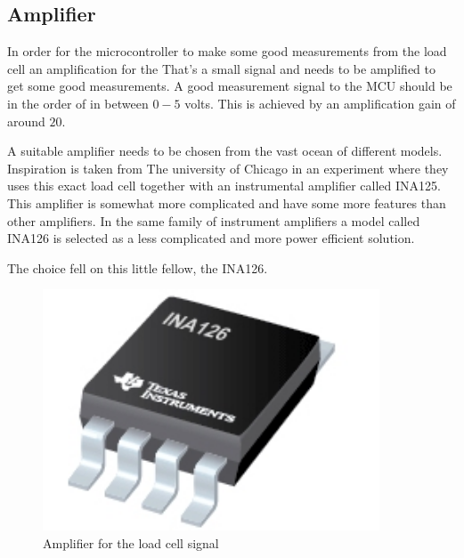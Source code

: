 \subsection{Amplifier}


In order for the microcontroller to make some good measurements from the load cell an amplification for the  
That’s a small signal and needs to be amplified to get some good measurements. A good measurement signal to the MCU should be in the order of in between $0 - 5$ volts. 
This is achieved by an amplification gain of around $20$. 


A suitable amplifier needs to be chosen from the vast ocean of different models. Inspiration is taken from The university of Chicago\cite{UoC} in an experiment where they uses this exact load cell together with an instrumental amplifier called INA125. This amplifier is somewhat more complicated and have some more features than other amplifiers. %
In the same family of instrument amplifiers a model called INA126 is selected as a less complicated and more power efficient solution.


The choice fell on this little fellow, the INA126. %

\begin{figure}[H]%
\begin{center}
	\includegraphics[width = 10cm]{Figures/INA126.png}
	\caption{Amplifier for the load cell signal}
	\label{INA126}
\end{center}
\end{figure}


